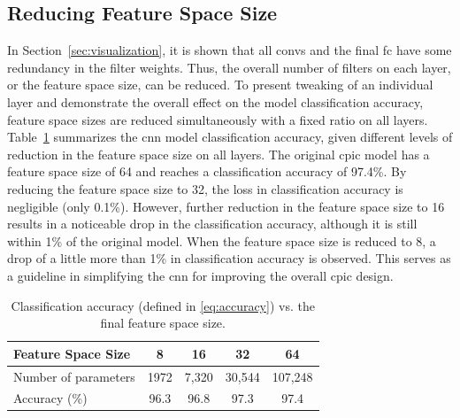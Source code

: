 \documentclass{article}
\begin{document}
\subsection{Reducing Feature Space Size}
\label{sec:feature_size}
%
In Section~\ref{sec:visualization}, it is shown that all \glspl{conv} and the final \gls{fc} have some redundancy in the filter weights.
Thus, the overall number of filters on each layer, or the feature space size, can be reduced.
To present tweaking of an individual layer and demonstrate the overall effect on the model classification accuracy,  feature space sizes are reduced simultaneously with a fixed ratio on all layers.
Table~\ref{tab:feature_size} summarizes the \gls{cnn} model classification accuracy, given different levels of reduction in the feature space size on all layers.
The original \gls{cpic} model has a feature space size of 64 and reaches a classification accuracy of 97.4\%.
By reducing the feature space size to 32, the loss in classification accuracy is negligible (only 0.1\%).
However, further reduction in the feature space size to 16 results in a noticeable drop in the classification accuracy, although it is still within 1\% of the original model.
When the feature space size is reduced to 8, a drop of a little more than 1\% in classification accuracy is observed.
This serves as a guideline in simplifying the \gls{cnn} for improving the overall \gls{cpic} design.
%
\begin{table}
    \centering
    \caption{Classification accuracy (defined in \eqref{eq:accuracy}) vs. the final feature space size.}
    \label{tab:feature_size}
    \begin{tabular}{l c c c c}
        \toprule
        Feature Space Size & 8 & 16 & 32 & 64\\
        \midrule
        Number of parameters & 1972 & 7,320 & 30,544 & 107,248\\
        Accuracy (\%) & 96.3 & 96.8 & 97.3 & 97.4\\
        \bottomrule
    \end{tabular}
\end{table}
\end{document}
